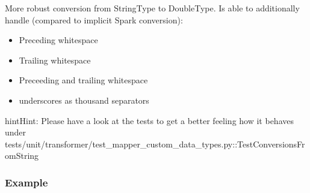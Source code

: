 \documentclass[a4paper,10pt, twoside,english]{sphinxmanual}
\begin{document}

\begin{fulllineitems}
\label{\detokenize{transformer/mapper:spooq2.transformer.mapper_custom_data_types._generate_select_expression_for_extended_string_to_double}}
More robust conversion from StringType to DoubleType.
Is able to additionally handle (compared to implicit Spark conversion):
\begin{itemize}
\item {} 
Preceding whitespace

\item {} 
Trailing whitespace

\item {} 
Preceeding and trailing whitespace

\item {} 
underscores as thousand separators

\end{itemize}

\begin{sphinxadmonition}{hint}{Hint:}
Please have a look at the tests to get a better feeling how it behaves under
tests/unit/transformer/test\_mapper\_custom\_data\_types.py::TestConversionsFromString
\end{sphinxadmonition}
\subsubsection*{Example}


\end{fulllineitems}
\end{document}
